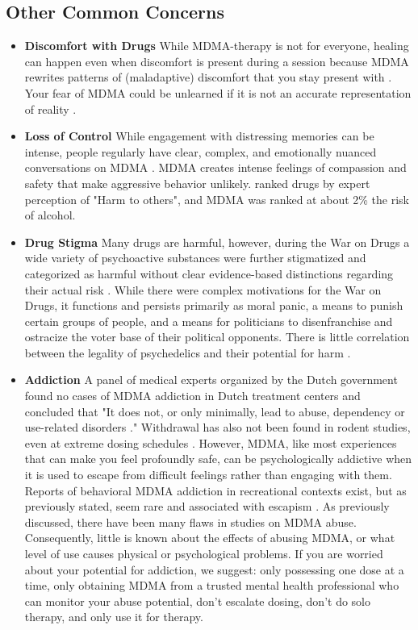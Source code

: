 \documentclass[12pt,letterpaper]{book}
\begin{document}
\subsection*{Other Common Concerns}
\begin{itemize}
    \item \textbf{Discomfort with Drugs}
        While MDMA-therapy is not for everyone, healing can happen even when discomfort is present during a session because MDMA rewrites patterns of (maladaptive) discomfort that you stay present with \cite{fedduciaMDMAMemoryReconsolidation}. Your fear of MDMA could be unlearned if it is not an accurate representation of reality \cite{eckerUnlocking}.
    \item \textbf{Loss of Control}
        While engagement with distressing memories can be intense, people regularly have clear, complex, and emotionally nuanced conversations on MDMA \cite{colbertEvenings,passieHistory}. MDMA creates intense feelings of compassion and safety that make aggressive behavior unlikely. \textcite{nuttDrugHarms} ranked drugs by expert perception of "Harm to others", and MDMA was ranked at about 2\% the risk of alcohol.
    \item \textbf{Drug Stigma}
        Many drugs are harmful, however, during the War on Drugs a wide variety of psychoactive substances were further stigmatized and categorized as harmful without clear evidence-based distinctions regarding their actual risk \cite{alexanderNewJimCrow,nuttDrugHarms}. While there were complex motivations for the War on Drugs, it functions and persists primarily as moral panic, a means to punish certain groups of people, and a means for politicians to disenfranchise and ostracize the voter base of their political opponents. There is little correlation between the legality of psychedelics and their potential for harm \cite{nuttDrugHarms}.
    \item \textbf{Addiction}
        A panel of medical experts organized by the Dutch government found no cases of MDMA addiction in Dutch treatment centers and concluded that "It does not, or only minimally, lead to abuse, dependency or use-related disorders \cite{netherlandsMDMA}." Withdrawal has also not been found in rodent studies, even at extreme dosing schedules \cite{robledoDependence}. However, MDMA, like most experiences that can make you feel profoundly safe, can be psychologically addictive when it is used to escape from difficult feelings rather than engaging with them. Reports of behavioral MDMA addiction in recreational contexts exist, but as previously stated, seem rare and associated with escapism \cite{erowidAbuse}. As previously discussed, there have been many flaws in studies on MDMA abuse. Consequently, little is known about the effects of abusing MDMA, or what level of use causes physical or psychological problems. If you are worried about your potential for addiction, we suggest: only possessing one dose at a time, only obtaining MDMA from a trusted mental health professional who can monitor your abuse potential, don't escalate dosing, don't do solo therapy, and only use it for therapy.

\end{itemize}
\end{document}

